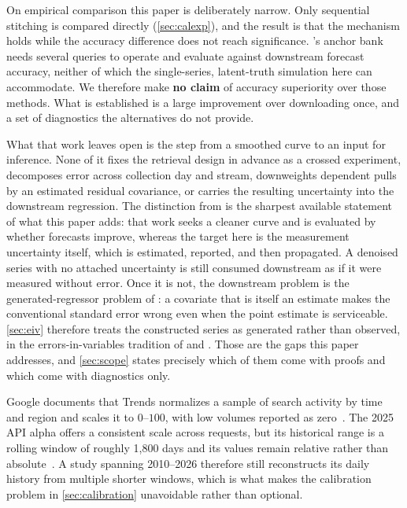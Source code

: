 \documentclass[12pt,a4paper,oneside]{article}
\begin{document}
On empirical comparison this paper is deliberately narrow. Only sequential
stitching is compared directly (\cref{sec:calexp}), and the result is that the
mechanism holds while the accuracy difference does not reach significance.
\citet{West2020}'s anchor bank needs several queries to operate and
\citet{Djorno2026} evaluate against downstream forecast accuracy, neither of
which the single-series, latent-truth simulation here can accommodate. We
therefore make \textbf{no claim} of accuracy superiority over those methods. What
is established is a large improvement over downloading once, and a set of
diagnostics the alternatives do not provide.

What that work leaves open is the step from a smoothed curve to an input for
inference. None of it fixes the retrieval design in advance as a crossed
experiment, decomposes error across collection day and stream, downweights
dependent pulls by an estimated residual covariance, or carries the resulting
uncertainty into the downstream regression. The distinction from
\citet{Djorno2026} is the sharpest available statement of what this paper adds:
that work seeks a cleaner curve and is evaluated by whether forecasts improve,
whereas the target here is the measurement uncertainty itself, which is
estimated, reported, and then propagated. A denoised series with no attached
uncertainty is still consumed downstream as if it were measured without error.
Once it is not, the downstream problem is the generated-regressor problem of
\citet{Pagan1984}: a covariate that is itself an estimate makes the conventional
standard error wrong even when the point estimate is serviceable. \cref{sec:eiv}
therefore treats the constructed series as generated rather than observed, in
the errors-in-variables tradition of \citet{Carroll2006} and
\citet{CookStefanski1994}. Those are the gaps this paper addresses, and
\cref{sec:scope} states precisely which of them come with proofs and which come
with diagnostics only.

\begin{remark}
Google documents that Trends normalizes a sample of search activity by time and
region and scales it to $0$--$100$, with low volumes reported as
zero~\citep{GoogleFAQ}. The 2025 API alpha offers a consistent scale across
requests, but its historical range is a rolling window of roughly 1{,}800 days
and its values remain relative rather than absolute~\citep{GoogleAPI2025}. A
study spanning 2010--2026 therefore still reconstructs its daily history from
multiple shorter windows, which is what makes the calibration problem in
\cref{sec:calibration} unavoidable rather than optional.
\end{remark}
\end{document}
